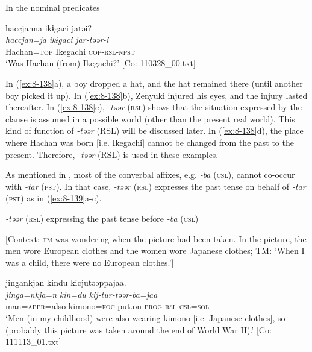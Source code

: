   In the nominal predicates

\ex
{\US}
\glll   haccjanna  ikɨgaci  jatəi?\\
\textit{haccjan=ja}  \textit{ikɨgaci}  \textit{jar-təər-i}\\
Hachan=\textsc{top}  Ikegachi  \textsc{cop}-\textsc{rsl}-\textsc{npst}\\
\glt ‘Was Hachan (from) Ikegachi?’ [Co: 110328\_00.txt]
\z
\z

In (\ref{ex:8-138}a), a boy dropped a hat, and the hat remained there (until another boy picked it up). In (\ref{ex:8-138}b), Zenyuki injured his eyes, and the injury lasted thereafter. In (\ref{ex:8-138}c), \textit{-təər} (\textsc{rsl}) shows that the situation expressed by the clause is assumed in a possible world (other than the present real world). This kind of function of \textit{-təər} (RSL) will be discussed later. In (\ref{ex:8-138}d), the place where Hachan was born [i.e. Ikegachi] cannot be changed from the past to the present. Therefore, \textit{-təər} (RSL) is used in these examples.

  As mentioned in , most of the converbal affixes, e.g. \textit{-ba} (\textsc{csl}), cannot co-occur with \textit{-tar} (\textsc{pst}). In that case, \textit{-təər} (\textsc{rsl}) expresses the past tense on behalf of \textit{-tar} (\textsc{pst}) as in (\ref{ex:8-139}a-c).

\ea\label{ex:8-139}
  \textit{-təər} (\textsc{rsl}) expressing the past tense before \textit{-ba} (\textsc{csl})

\ea {}[Context: \textsc{tm} was wondering when the picture had been taken. In the picture, the men wore European clothes and the women wore Japanese clothes; TM: ‘When I was a child, there were no European clothes.’]

{\TM}
\glll  jingankjan  kindu  kicjutəəppajaa.\\
\textit{jinga=nkja=n}  \textit{kin=du}  \textit{kij-tur-təər-ba=jaa}\\
man=\textsc{appr}=also  kimono=\textsc{foc}  put.on-\textsc{prog}-\textsc{rsl}-\textsc{csl}=\textsc{sol}\\
\glt ‘Men (in my childhood) were also wearing kimono [i.e. Japanese clothes], so (probably this picture was taken around the end of World War II).’ [Co: 111113\_01.txt]


